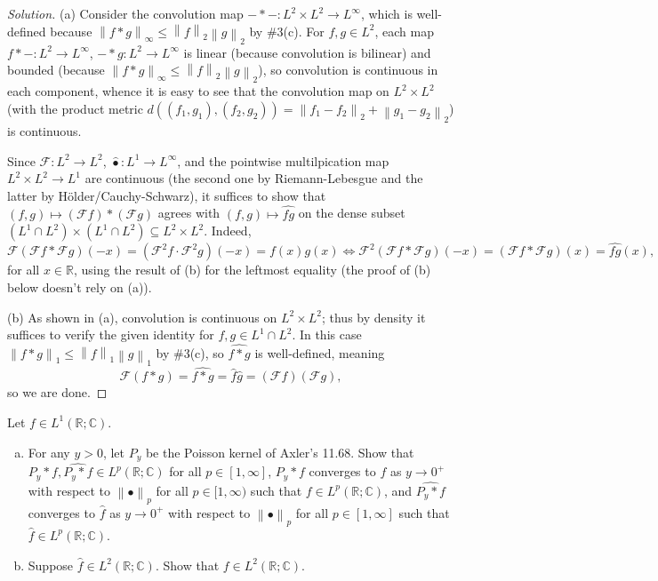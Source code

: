 \documentclass[10pt]{article}
\providecommand{\CC}{\mathbb C}
\providecommand{\RR}{\mathbb R}
\providecommand{\ii}{\item}
\newcommand{\what}{\widehat}
\newenvironment{soln}{\begin{proof}[Solution]}{\end{proof}}
\providecommand{\norm}[1]{\left\| #1\right\|}
\begin{document}
\begin{soln}
    (a) Consider the convolution map $-*-\colon L^2\times L^2\to L^\infty$,
    which is well-defined because $\norm{f*g}_\infty \le \norm{f}_2\norm{g}_2$
    by \#3(c). For $f,g\in L^2$,
    each map $f*-\colon L^2\to L^\infty$, $-*g\colon L^2\to L^\infty$
    is linear (because convolution is bilinear) and bounded
    (because $\norm{f*g}_\infty \le \norm{f}_2\norm{g}_2$),
    so convolution is continuous in each component,
    whence it is easy to see that the convolution map
    on $L^2\times L^2$ (with the product metric
    $d((f_1,g_1),(f_2,g_2)) = \norm{f_1-f_2}_2 + \norm{g_1-g_2}_2$) is continuous.

    Since $\mathcal F\colon L^2\to L^2$, $\what{\bullet}\colon L^1\to L^\infty$,
    and the pointwise multilpication map $L^2\times L^2\to L^1$ are continuous
    (the second one by Riemann-Lebesgue and the latter by H\"older/Cauchy-Schwarz),
    it suffices to show that
    $(f,g)\mapsto (\mathcal Ff)*(\mathcal Fg)$
    agrees with $(f,g)\mapsto\what{fg}$ on the dense subset
    $(L^1\cap L^2)\times(L^1\cap L^2)\subseteq L^2\times L^2$. Indeed,
    \begin{equation*}
	\mathcal F(\mathcal Ff*\mathcal Fg)(-x)
	= (\mathcal F^2f\cdot\mathcal F^2g)(-x)
	= f(x)g(x)
	\iff 
	\mathcal F^2(\mathcal Ff*\mathcal Fg)(-x)
	= (\mathcal Ff*\mathcal Fg)(x)
	= \what{fg}(x),
    \end{equation*}
    for all $x\in\RR$,
    using the result of (b) for the leftmost equality
    (the proof of (b) below doesn't rely on (a)).

    (b) As shown in (a), convolution is continuous on $L^2\times L^2$;
    thus by density it suffices to verify the given identity for
    $f,g\in L^1\cap L^2$. In this case $\norm{f*g}_1 \le \norm{f}_1\norm{g}_1$
    by \#3(c), so $\what{f*g}$ is well-defined, meaning
    \begin{equation*}
	\mathcal F(f*g) = \what{f*g} = \what f\what g =
	(\mathcal Ff)(\mathcal Fg),
    \end{equation*}
    so we are done.
\end{soln}

\begin{problem}
    Let $f\in L^1(\RR;\CC)$.
    \begin{enumerate}[(a)]
        \ii For any $y > 0$, let $P_y$ be the Poisson kernel of Axler's 11.68.
	Show that $P_y*f, \what{P_y*f}\in L^p(\RR;\CC)$ for all $p\in[1,\infty]$,
	$P_y*f$ converges to $f$ as $y\to 0^+$
	with respect to $\norm{\bullet}_p$ for all $p\in[1,\infty)$
	such that $f\in L^p(\RR;\CC)$, and $\what{P_y*f}$ converges to $\what f$
	as $y\to 0^+$ with respect to $\norm{\bullet}_p$ for all $p\in[1,\infty]$
	such that $\what f\in L^p(\RR;\CC)$.
	\ii Suppose $\what f\in L^2(\RR;\CC)$. Show that $f\in L^2(\RR;\CC)$.
    \end{enumerate}
\end{problem}
\end{document}
